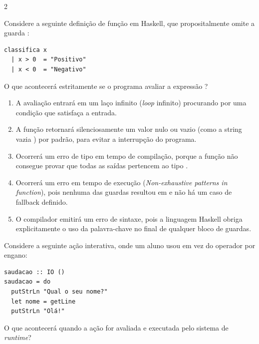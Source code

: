 \documentclass[a4paper,10pt,brazil]{article}
\begin{document}
\begin{multicols}{2}
\begin{enumerate}
\end{enumerate}

Considere a seguinte definição de função em Haskell, que propositalmente omite a guarda :

\begin{verbatim}
classifica x
  | x > 0  = "Positivo"
  | x < 0  = "Negativo"
\end{verbatim}

O que acontecerá estritamente se o programa avaliar a expressão ?

\begin{enumerate}
  \item A avaliação entrará em um laço infinito (\emph{loop} infinito) procurando por uma condição que satisfaça a entrada.

  \item A função retornará silenciosamente um valor nulo ou vazio (como a string vazia ) por padrão, para evitar a interrupção do programa.

  \item Ocorrerá um erro de tipo em tempo de compilação, porque a função não consegue provar que todas as saídas pertencem ao tipo .

  \item Ocorrerá um erro em tempo de execução (\emph{Non-exhaustive patterns in function}), pois nenhuma das guardas resultou em  e não há um caso de fallback definido.

  \item O compilador emitirá um erro de sintaxe, pois a linguagem Haskell obriga explicitamente o uso da palavra-chave  no final de qualquer bloco de guardas.


\end{enumerate}

Considere a seguinte ação interativa, onde um aluno usou  em vez do operador \haskellinline{<-} por engano:

\begin{verbatim}
saudacao :: IO ()
saudacao = do
  putStrLn "Qual o seu nome?"
  let nome = getLine
  putStrLn "Olá!"
\end{verbatim}

O que acontecerá quando a ação  for avaliada e executada pelo sistema de \emph{runtime}?


\end{multicols}
\end{document}
